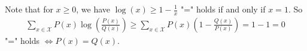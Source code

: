 \begin{answer}

Note that for $ x \geq 0$, we have $ \log(x)\geq 1 - \frac{1}{x} $
"=" holds if and only if $ x = 1 $.
So \begin{align*}
\sum_{x \in \mathcal{X}}P(x)\log(\frac{P(x)}{Q(x)}) \geq \sum_{x \in \mathcal{X}}P(x)(1 - \frac{Q(x)}{P(x)}) = 1 - 1 = 0
\end{align*}
"=" holds $\Leftrightarrow P(x) = Q(x) $.
\end{answer}
